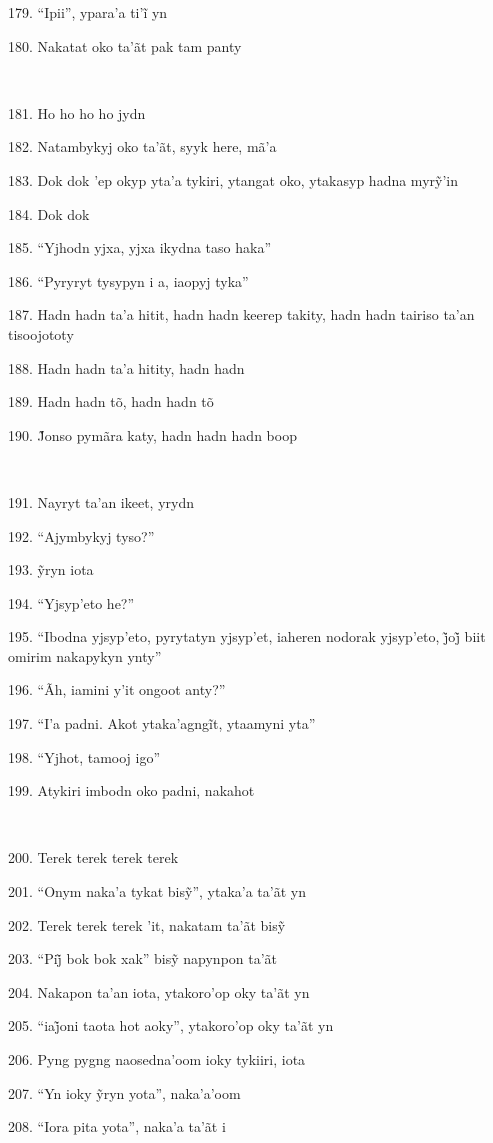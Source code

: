 179. ``Ipii'', ypara’a ti’ĩ yn

180. Nakatat oko ta'ãt pak tam panty

~

181. Ho ho ho ho jydn

182. Natambykyj oko ta'ãt, syyk here, mã'a

183. Dok dok ’ep okyp yta’a tykiri, ytangat oko, ytakasyp hadna myrỹ’in

184. Dok dok

185. ``Yjhodn yjxa, yjxa ikydna taso haka''

186. ``Pyryryt tysypyn i a, iaopyj tyka''

187. Hadn hadn ta'a hitit, hadn hadn keerep takity, hadn hadn tairiso
ta'an tisoojototy

188. Hadn hadn ta'a hitity, hadn hadn

189. Hadn hadn tõ, hadn hadn tõ

190. J̃onso pymãra katy, hadn hadn hadn boop

~

191. Nayryt ta'an ikeet, yrydn

192. ``Ajymbykyj tyso?''

193. ỹryn iota

194. ``Yjsyp'eto he?''

195. ``Ibodna yjsyp’eto, pyrytatyn yjsyp’et, iaheren nodorak yjsyp’eto, j̃oj̃ biit omirim nakapykyn ynty''

196. ``Ãh, iamini y'it ongoot anty?''

197. ``I’a padni. Akot ytaka’agngĩt, ytaamyni yta''

198. ``Yjhot, tamooj igo''

199. Atykiri imbodn oko padni, nakahot

~

200. Terek terek terek terek

201. ``Onym naka’a tykat bisỹ'', ytaka’a ta’ãt yn

202. Terek terek terek ’it, nakatam ta’ãt bisỹ

203. ``Pij̃ bok bok xak'' bisỹ napynpon ta’ãt

204. Nakapon ta'an iota, ytakoro'op oky ta'ãt yn

205. ``iaj̃oni taota hot aoky'', ytakoro’op oky ta’ãt yn

206. Pyng pygng naosedna'oom ioky tykiiri, iota

207. ``Yn ioky ỹryn yota'', naka’a’oom

208. ``Iora pita yota'', naka'a ta'ãt i

